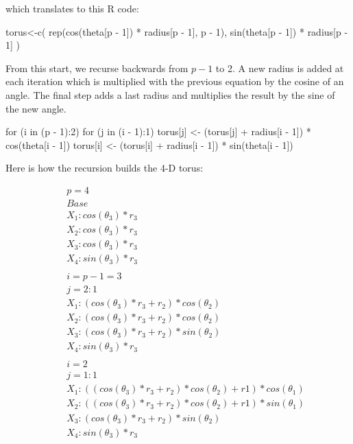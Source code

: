 \noindent which translates to this R code:

\begin{example}
torus<-c(
  rep(cos(theta[p - 1]) * radius[p - 1], p - 1),
  sin(theta[p - 1]) * radius[p - 1]
)
\end{example}

From this start, we recurse backwards from $p-1$ to 2. A new radius is
added at each iteration which is multiplied with the previous equation
by the cosine of an angle. The final step adds a last radius and
multiplies the result by the sine of the new angle.

\begin{example}
for (i in (p - 1):2) {
  for (j in (i - 1):1) {
    torus[j] <- (torus[j] + radius[i - 1]) * cos(theta[i - 1])
  }
  torus[i] <- (torus[i] + radius[i - 1]) * sin(theta[i - 1])
}
\end{example}

Here is how the recursion builds the 4-D torus:

\begin{eqnarray*}
&&p=4\\
&&Base\\
&&X_1: cos(\theta_3) * r_3\\
&&X_2: cos(\theta_3) * r_3\\
&&X_3: cos(\theta_3) * r_3\\
&&X_4: sin(\theta_3) * r_3\\
\\
&&i=p-1=3\\
&&j=2:1\\
&&X_1: (cos(\theta_3) * r_3 + r_2) * cos(\theta_2)\\
&&X_2: (cos(\theta_3) * r_3 + r_2) * cos(\theta_2)\\
&&X_3: (cos(\theta_3) * r_3 + r_2) * sin(\theta_2)\\
&&X_4: sin(\theta_3) * r_3\\
\\
&&i=2\\
&&j=1:1\\
&&X_1: ((cos(\theta_3) * r_3 + r_2) * cos(\theta_2) + r1) * cos(\theta_1)\\
&&X_2: ((cos(\theta_3) * r_3 + r_2) * cos(\theta_2) + r1) * sin(\theta_1)\\
&&X_3: (cos(\theta_3) * r_3 + r_2) * sin(\theta_2)\\
&&X_4: sin(\theta_3) * r_3\\
\end{eqnarray*}

